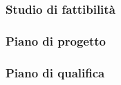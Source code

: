 \subsubsection{Studio di fattibilit\`{a}}


\subsubsection{Piano di progetto}


\subsubsection{Piano di qualifica}
